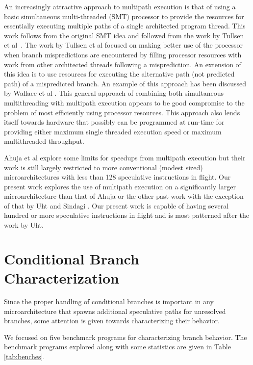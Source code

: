\documentclass[10pt,dvips]{article}
\begin{document}
An increasingly attractive approach to multipath execution is that
of using a basic simultaneous multi-threaded (SMT) processor
to provide the resources for essentially executing multiple paths
of a single architected program thread.  This work follows from
the original SMT idea and followed from the work by
Tullsen et al~\cite{Tullsen96}.  
The work by Tullsen et al focused
on making better use of the processor when
branch mispredictions are encountered by filling processor resources with
work from other architected threads following a misprediction.
An extension of this idea is to use resources for executing
the alternative path (not predicted path) of a mispredicted branch.
An example of this approach has been discussed by 
Wallace et al \cite{Wallace98}.  This general approach of combining
both simultaneous multithreading with multipath execution appears
to be good compromise to the problem of most efficiently using
processor resources.  This approach also lends itself towards
hardware that possibly can be programmed at run-time for providing either
maximum single threaded execution speed or maximum multithreaded throughput.

Ahuja et al \cite{Ahuja98} explore some limits for speedups from
multipath execution but their work is still largely restricted to more
conventional (modest sized) microarchitectures with less than 128
speculative instructions in flight.  Our present work explores the use
of multipath execution on a significantly larger microarchitecture than
that of Ahuja or the other past work with the exception of that by
Uht and 
Sindagi \cite{Uht95}.
Our present work is capable of having several hundred or more
speculative instructions in flight and is most patterned after the
work by Uht.
%
\section{Conditional Branch Characterization}
%
Since the proper handling of conditional branches is important
in any microarchitecture that spawns additional speculative
paths for unresolved branches, some attention is given
towards characterizing their behavior.  

We focused
on five benchmark programs for characterizing branch behavior.
The benchmark programs explored along with some statistics 
are given in Table \ref{tab:benches}.
\end{document}
